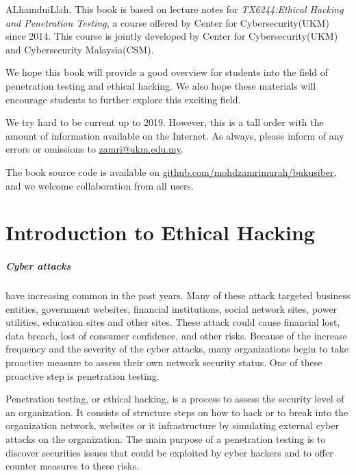\documentclass[7x9]{times}
\begin{document}
\begin{preface}

ALhamduiLlah. This book is based on lecture notes for
\textit{TX6244:Ethical Hacking and Penetration Testing}, a course
offered by Center for Cybersecurity(UKM) since 2014. This course is
jointly developed by Center for Cybersecurity(UKM) and Cybersecurity
Malaysia(CSM).

We hope this book will provide a good overview for students into the
field of penetration testing and ethical hacking. We also hope these
materials will encourage students to further explore this exciting
field.

We try hard to be current up to 2019. However, this is a tall order
with the amount of information available on the Internet. As always,
please inform of any errors or omissions to \url{zamri@ukm.edu.my}.

The book source code is available on
\url{github.com/mohdzamrimurah/bukusiber}, and we welcome
collaboration from all users.



\end{preface}

\chapter{Introduction to Ethical Hacking}

\paragraph{Cyber attacks} have increasing common in the past years. Many of these attack
targeted business entities, government websites, financial institutions, 
social network sites, power utilities, education sites and other sites. These 
attack could cause financial lost, data breach, lost of consumer confidence, 
and other risks. Because
of the increase frequency and the severity of the cyber attacks, many 
organizations begin to
take proactive measure to assess their own network security status. One of these proactive
step is penetration testing.

Penetration testing, or ethical hacking, is a process to assess the security level of an organization. It consists of structure steps on how to hack or to break into the organization
network, websites or it infrastructure by simulating external cyber attacks on the 
organization. The main purpose of a penetration testing is to discover securities issues
that could be exploited by cyber hackers and to offer counter measures to these risks.
\end{document}
